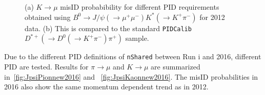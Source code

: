 \begin{figure}[h!]
		\caption{(a) $K \rightarrow \mu$ misID probabibility for different PID requirements obtained using $B^{0} \rightarrow J/\psi(\rightarrow \mu^{+} \mu^{-}) K^{*} (\rightarrow {K^{+} \pi^{-}} )$ for 2012 data. (b) This is compared to the standard \texttt{PIDCalib} $D^{*+}(\rightarrow D^{0}(\rightarrow K^{+} \pi^{-}) \pi^{+})$ sample. \DIFaddbeginFL {}\texttt{} \DIFaddendFL }
		\label{fig:JpsiKaonnew}
\end{figure}

Due to the different \gls{PID} definitions of \texttt{nShared} between Run \Rn{1} and 2016, different \gls{PID} \DIFdelbegin {}\DIFdelend \DIFaddbegin {}\DIFaddend are tested.  Results for $\pi \rightarrow \mu$ and $K \rightarrow \mu$ are summarized in~\autoref{fig:JpsiPionnew2016} and
~\autoref{fig:JpsiKaonnew2016}. The misID probabilities in 2016 \DIFdelbegin {}\DIFdelend also show the same momentum dependent trend as in 2012. 



